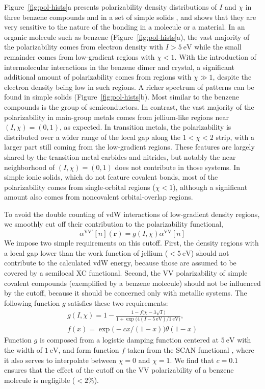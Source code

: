 Figure~\ref{fig:pol-hists}a presents polarizability density distributions of $I$ and $\chi$ in three benzene compounds and in a set of simple solids \citep{ZhangNJP18}, and shows that they are very sensitive to the nature of the bonding in a molecule or a material.
In an organic molecule such as benzene (Figure~\ref{fig:pol-hists}a), the vast majority of the polarizability
comes from electron density with $I>\SI{5}{\electronvolt}$ while the small remainder comes
from low-gradient regions with $\chi<1$.
With the introduction of intermolecular interactions in the benzene dimer and crystal, a significant additional amount of polarizability comes from regions with $\chi\gg1$, despite the electron density being low in such regions.
A richer spectrum of patterns can be found in simple solids (Figure~\ref{fig:pol-hists}b).
Most similar to the benzene compounds is the group of semiconductors.
In contrast, the vast majority of the polarizability in main-group metals comes from jellium-like regions near $(I,\chi)=(0,1)$, as expected.
In transition metals, the polarizability is distributed over a wider range of the local gap along the $1<\chi<2$ strip, with a larger part still coming from the low-gradient regions.
These features are largely shared by the transition-metal carbides and nitrides, but notably the near neighborhood of $(I,\chi)=(0,1)$ does not contribute in those systems.
In simple ionic solids, which do not feature covalent bonds, most of the polarizability comes from single-orbital regions ($\chi<1$), although a significant amount also comes from noncovalent orbital-overlap regions.

To avoid the double counting of vdW interactions of low-gradient density regions, we smoothly cut off their contribution to the polarizability functional,
\begin{equation}
  \alpha^\mathrm{VV'}[n](\mathbf r)=g(I,\chi)\alpha^\text{VV}[n]
\end{equation}
We impose two simple requirements on this cutoff.
First, the density regions with a local gap lower than the work function of jellium ($<\SI{5}{\electronvolt}$) should not contribute to the calculated vdW energy, because those are assumed to be covered by a semilocal XC functional.
Second, the VV polarizability of simple covalent compounds (exemplified by a benzene molecule) should not be influenced by the cutoff, because it should be concerned only with metallic systems.
The following function $g$ satisfies these two requirements:
\begin{gather}
  g(I,\chi)=1-\frac{1-f\bigl(\chi-3\sqrt{I}\bigr)}{1+\exp\bigl(4(I-\SI{5}{\electronvolt})/\SI{1}{\electronvolt}\bigr)}, \\
  f(x)=\exp\bigl(-cx/(1-x)\bigr)\theta(1-x)
\end{gather}
Function $g$ is composed from a logistic damping function centered at $\SI{5}{\electronvolt}$ with the width of $\SI{1}{\electronvolt}$, and form function $f$ taken from the SCAN functional \citep{SunPRL15}, where it also serves to interpolate between $\chi=0$ and $\chi=1$.
We find that $c=0.1$ ensures that the effect of the cutoff on the VV polarizability of a benzene molecule is negligible ($<2\%$).

